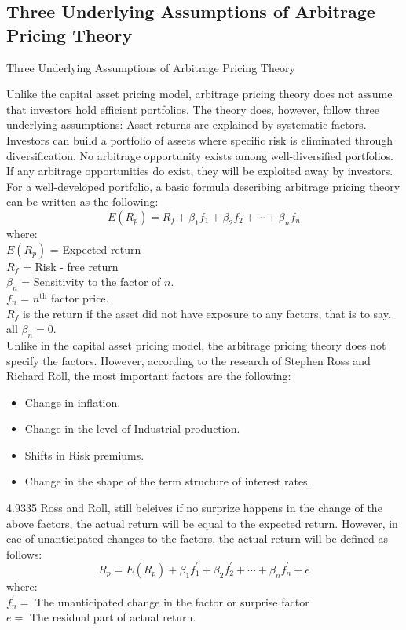 \documentclass[unknownkeysallowed, compress]{beamer}
\theoremstyle{plain}
\begin{document}
\subsection{Three Underlying Assumptions of Arbitrage Pricing Theory}
\begin{frame}[allowframebreaks]{Three Underlying Assumptions of Arbitrage Pricing Theory}
\noindent
\par Unlike the capital asset pricing model, arbitrage pricing theory does not assume that
investors hold efficient portfolios. The theory does, however, follow three underlying
assumptions: Asset returns are explained by systematic factors. Investors can build a
portfolio of assets where specific risk is eliminated through diversification. No arbitrage
opportunity exists among well-diversified portfolios. If any arbitrage opportunities do
exist, they will be exploited away by investors.\\

For a well-developed portfolio, a basic formula describing arbitrage pricing theory can be written as the following:
$$
E(R_p) = R_f+\beta_1f_1+\beta_2f_2+\cdots+\beta_nf_n
$$
where:\\
$E(R_p)$ = Expected return\\
$R_f$ = Risk - free return\\
$\beta_n$ = Sensitivity to the factor of $n$.\\
$f_n$ = $n^{\mbox{th}}$ factor price.\\

$R_f$ is the return if the asset did not have exposure to any factors, that is to say, all $\beta_n = 0$.\\
Unlike in the capital asset pricing model, the arbitrage pricing theory does not specify the factors. However, according to the research of Stephen Ross and Richard Roll, the most important factors are the following:
\begin{itemize}
\item Change in inflation.
\item Change in the level of Industrial production.
\item Shifts in Risk premiums.
\item Change in the shape of the term structure of interest rates.
\end{itemize}4.9335
Ross and Roll, still beleives if no surprize happens in the change of the above factors, the actual return will be equal to the expected return. However, in cae of unanticipated changes to the factors, the actual return will be defined as follows:
$$
R_p = E(R_p) + \beta_1f_1^\prime+\beta_2f_2^\prime +\cdots + \beta_nf_n^\prime +e
$$
where:\\
$f_n^\prime = $ The unanticipated change in the factor or surprise factor\\
$e = $ The residual part of actual return.



\end{frame}
\end{document}
